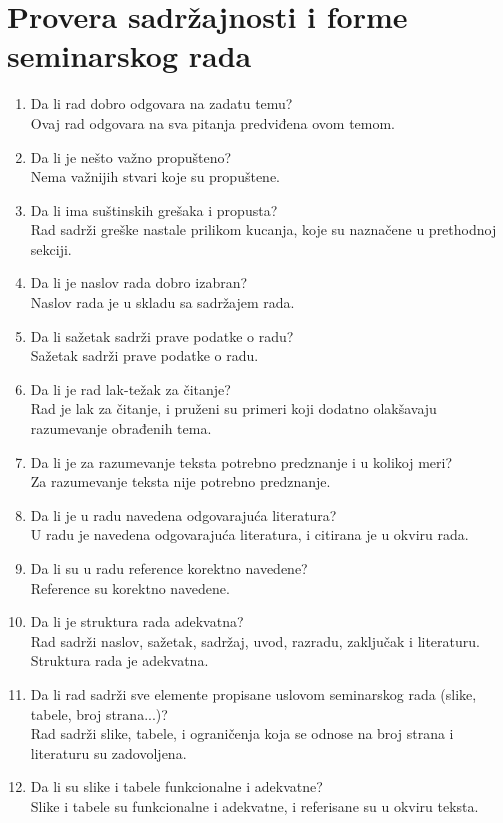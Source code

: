 \documentclass[a4paper]{article}
\begin{document}
\section{Provera sadržajnosti i forme seminarskog rada}

\begin{enumerate}
\item Da li rad dobro odgovara na zadatu temu?\\
Ovaj rad odgovara na sva pitanja predviđena ovom temom.
\item Da li je nešto važno propušteno?\\
Nema važnijih stvari koje su propuštene.
\item Da li ima suštinskih grešaka i propusta?\\
Rad sadrži greške nastale prilikom kucanja, koje su naznačene u prethodnoj sekciji.
\item Da li je naslov rada dobro izabran?\\
Naslov rada je u skladu sa sadržajem rada.
\item Da li sažetak sadrži prave podatke o radu?\\
Sažetak sadrži prave podatke o radu.
\item Da li je rad lak-težak za čitanje?\\
Rad je lak za čitanje, i pruženi su primeri koji dodatno olakšavaju razumevanje obrađenih tema.
\item Da li je za razumevanje teksta potrebno predznanje i u kolikoj meri?\\
Za razumevanje teksta nije potrebno predznanje.
\item Da li je u radu navedena odgovarajuća literatura?\\
U radu je navedena odgovarajuća literatura, i citirana je u okviru rada.
\item Da li su u radu reference korektno navedene?\\
Reference su korektno navedene.
\item Da li je struktura rada adekvatna?\\
Rad sadrži naslov, sažetak, sadržaj, uvod, razradu, zaključak i literaturu. Struktura rada je adekvatna.
\item Da li rad sadrži sve elemente propisane uslovom seminarskog rada (slike, tabele, broj strana...)?\\
Rad sadrži slike, tabele, i ograničenja koja se odnose na broj strana i literaturu su zadovoljena.
\item Da li su slike i tabele funkcionalne i adekvatne?\\
Slike i tabele su funkcionalne i adekvatne, i referisane su u okviru teksta.
\end{enumerate}
\end{document}
